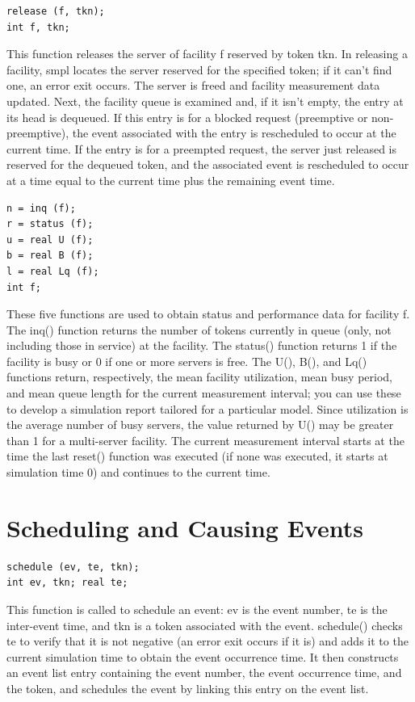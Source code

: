 \begin{verbatim}
release (f, tkn);
int f, tkn;
\end{verbatim}

This function releases the server of facility f reserved by token tkn. In
releasing a facility, smpl locates the server reserved for the specified token;
if it can't find one, an error exit occurs. The server is freed and facility
measurement data updated. Next, the facility queue is examined and, if it
isn't empty, the entry at its head is dequeued. If this entry is for a blocked
request (preemptive or non-preemptive), the event associated with the entry is
rescheduled to occur at the current time. If the entry is for a preempted
request, the server just released is reserved for the dequeued token, and the
associated event is rescheduled to occur at a time equal to the current time
plus the remaining event time.

\begin{verbatim}
n = inq (f);
r = status (f);
u = real U (f);
b = real B (f);
l = real Lq (f);
int f;
\end{verbatim}

These five functions are used to obtain status and performance data for
facility f. The inq() function returns the number of tokens currently in queue
(only, not including those in service) at the facility. The status() function
returns 1 if the facility is busy or 0 if one or more servers is free. The U(),
B(), and Lq() functions return, respectively, the mean facility utilization,
mean busy period, and mean queue length for the current measurement interval;
you can use these to develop a simulation report tailored for a particular
model. Since utilization is the average number of busy servers, the value
returned by U() may be greater than 1 for a multi-server facility. The current
measurement interval starts at the time the last reset() function was executed
(if none was executed, it starts at simulation time 0) and continues to the
current time.

\section{Scheduling and Causing Events}
\label{sec:smpl-scheduling-causing-events}

\begin{verbatim}
schedule (ev, te, tkn);
int ev, tkn; real te;
\end{verbatim}

This function is called to schedule an event: ev is the event number, te is
the inter-event time, and tkn is a token associated with the event.
schedule() checks te to verify that it is not negative (an error exit occurs if
it is) and adds it to the current simulation time to obtain the event
occurrence time. It then constructs an event list entry containing the event
number, the event occurrence time, and the token, and schedules the event by
linking this entry on the event list.

